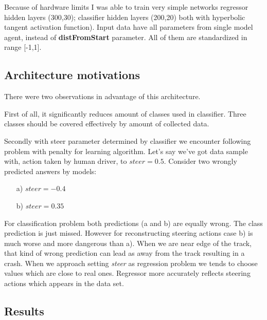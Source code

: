 \documentclass[declaration,shortabstract,english,inz]{iithesis}
\begin{document}
Because of hardware limits I was able to train very simple networks regressor hidden layers (300,30); classifier hidden layers (200,20) both with hyperbolic tangent activation function). Input data have all parameters from single model agent, instead of \textbf{distFromStart} parameter. All of them are standardized in range [-1,1].

\subsection{Architecture motivations}

There were two observations in advantage of this architecture. 

First of all, it significantly reduces amount of classes used in classifier. Three classes should be covered effectively by amount of collected data.

Secondly with steer parameter determined by classifier we encounter following problem with penalty for learning algorithm. Let's say we've got data sample with, action taken by human driver, to $steer=0.5$. Consider two wrongly predicted answers by models:
\begin{itemize}
    \item[a)] $steer=-0.4$
    \item[b)] $steer=0.35$
\end{itemize}

For classification problem both predictions (a and b) are equally wrong.  The class prediction is just missed. However for reconstructing steering actions case b) is much worse and more dangerous than a). When we are near edge of the track, that kind of wrong prediction can lead as away from the track resulting in a crash. When we approach setting \textit{steer} as regression problem we tends to choose values which are close to real ones. Regressor more accurately reflects steering actions which appears in the data set.

\subsection{Results}
\end{document}
